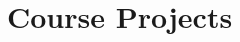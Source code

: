 {{\begin{multicols}{2}
{\begin{itemize}

        \end{itemize}
        }
		
		\vfill\null
		\columnbreak
		
		\section{Course Projects}
		

\end{multicols}}}
